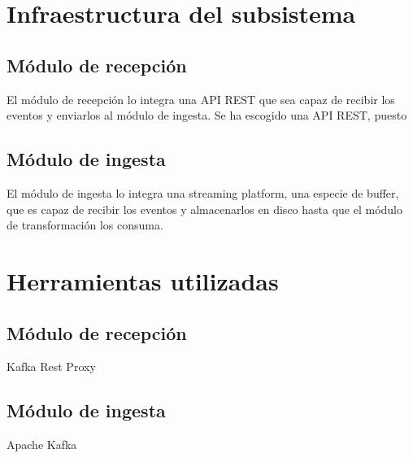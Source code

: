\section{Infraestructura del subsistema}

\subsection{Módulo de recepción}
El módulo de recepción lo integra una API REST que sea capaz de recibir los eventos y enviarlos al módulo de ingesta. Se ha escogido una API REST, puesto 

\subsection{Módulo de ingesta}
El módulo de ingesta lo integra una streaming platform, una especie de buffer, que es capaz de recibir los eventos y almacenarlos en disco hasta que el módulo de transformación los consuma.


\section{Herramientas utilizadas}

\subsection{Módulo de recepción}
Kafka Rest Proxy\cite{Tfg:kafkarestproxy}

\subsection{Módulo de ingesta}
Apache Kafka\cite{Tfg:kafka}


